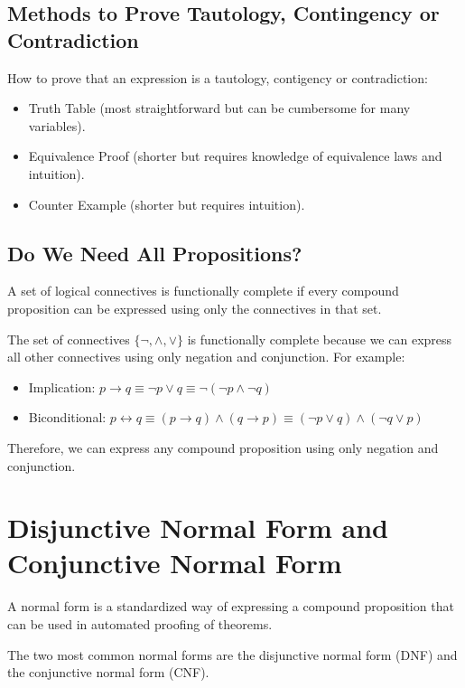 \subsection{Methods to Prove Tautology, Contingency or Contradiction}
How to prove that an expression is a tautology, contigency or contradiction:
\begin{itemize}[itemsep=1pt,label=$\circ$]
    \item Truth Table (most straightforward but can be cumbersome for many variables).
    \item Equivalence Proof (shorter but requires knowledge of equivalence laws and intuition).
    \item Counter Example (shorter but requires intuition).
\end{itemize}

\subsection{Do We Need All Propositions?}
\begin{definition}
    A set of logical connectives is functionally complete if every compound proposition can be expressed using only the connectives in that set.
\end{definition}

\begin{eg}
    The set of connectives \(\{\neg, \land, \lor\}\) is functionally complete because we can express all other connectives using only negation and conjunction. For example:
    \begin{itemize}[itemsep=1pt,label=$\circ$]
        \item Implication: \(p \to q \equiv \neg p \lor q \equiv \neg (\neg p \land \neg q)\)
        \item Biconditional: \(p \leftrightarrow q \equiv (p \to q) \land (q \to p) \equiv (\neg p \lor q) \land (\neg q \lor p)\)
    \end{itemize}
    Therefore, we can express any compound proposition using only negation and conjunction.
\end{eg}

\section{Disjunctive Normal Form and Conjunctive Normal Form}
\begin{definition}
    A normal form is a standardized way of expressing a compound proposition that can be used in automated proofing of theorems.
\end{definition}
The two most common normal forms are the disjunctive normal form (DNF) and the conjunctive normal form (CNF).

